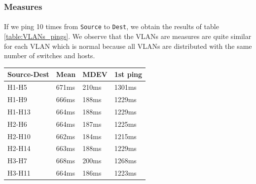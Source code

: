 \documentclass[a4paper, 11pt, oneside]{article}
\begin{document}
\subsubsection{Measures}

\paragraph{}If we ping 10 times from \texttt{Source} to \texttt{Dest}, we obtain the results of table \ref{table:VLANs_pings}. We observe that the VLANs are measures are quite similar for each VLAN which is normal because all VLANs are distributed with the same number of switches and hosts. 
\begin{table}[H]
    \centering
    \begin{tabular}{|l|l|l|l|}
    \hline
    \multicolumn{1}{|c|}{\textbf{Source-Dest}} & \multicolumn{1}{c|}{\textbf{Mean}} & \multicolumn{1}{c|}{\textbf{MDEV}} & \multicolumn{1}{c|}{\textbf{1st ping}} \\ \hline
    H1-H5                                      & 671ms                              & 210ms                              & 1301ms                                 \\ \hline
    H1-H9                                      & 666ms                              & 188ms                              & 1229ms                                 \\ \hline
    H1-H13                                      & 664ms                              & 188ms                              & 1229ms                                 \\ \hline
    H2-H6                                      & 664ms                              & 187ms                              & 1225ms                                 \\ \hline
    H2-H10                                      & 662ms                              & 184ms                              & 1215ms                                 \\ \hline
    H2-H14                                     & 663ms                              & 188ms                              & 1229ms                                 \\ \hline
    H3-H7                                      & 668ms                              & 200ms                              & 1268ms                                 \\ \hline
    H3-H11                                      & 664ms                              & 186ms                              & 1223ms                                 \\ \hline

\end{tabular}
\end{table}
\end{document}
